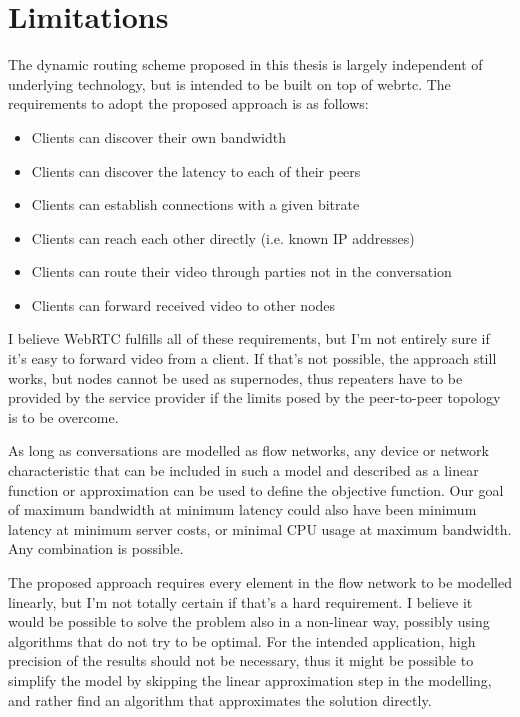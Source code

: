 \section{Limitations}

The dynamic routing scheme proposed in this thesis is largely independent of underlying technology, but is intended to be built on top of \gls{webrtc}. The requirements to adopt the proposed approach is as follows:

\begin{itemize}
    \item Clients can discover their own bandwidth
    \item Clients can discover the latency to each of their peers
    \item Clients can establish connections with a given bitrate
    \item Clients can reach each other directly (i.e. known IP addresses)
    \item Clients can route their video through parties not in the conversation
    \item Clients can forward received video to other nodes
\end{itemize}

I believe WebRTC fulfills all of these requirements, but I'm not entirely sure if it's easy to forward video from a client. If that's not possible, the approach still works, but nodes cannot be used as supernodes, thus repeaters have to be provided by the service provider if the limits posed by the peer-to-peer topology is to be overcome.

As long as conversations are modelled as flow networks, any device or network characteristic that can be included in such a model and described as a linear function or approximation can be used to define the objective function. Our goal of maximum bandwidth at minimum latency could also have been minimum latency at minimum server costs, or minimal CPU usage at maximum bandwidth. Any combination is possible.

The proposed approach requires every element in the flow network to be modelled linearly, but I'm not totally certain if that's a hard requirement. I believe it would be possible to solve the problem also in a non-linear way, possibly using algorithms that do not try to be optimal. For the intended application, high precision of the results should not be necessary, thus it might be possible to simplify the model by skipping the linear approximation step in the modelling, and rather find an algorithm that approximates the solution directly.



